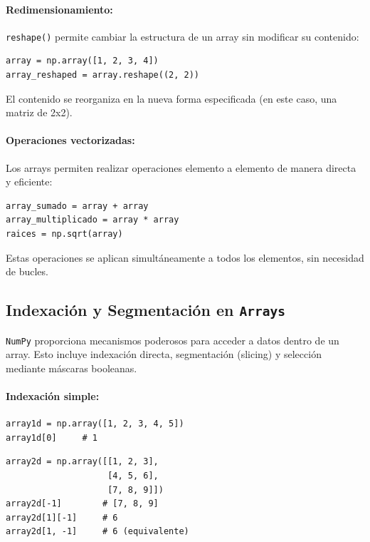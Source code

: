 \documentclass{article}
\theoremstyle{nonumberplain}
\begin{document}
\paragraph{Redimensionamiento:}

\texttt{reshape()} permite cambiar la estructura de un array sin modificar su contenido:

\begin{verbatim}
array = np.array([1, 2, 3, 4])
array_reshaped = array.reshape((2, 2))
\end{verbatim}

El contenido se reorganiza en la nueva forma especificada (en este caso, una matriz de 2x2).

\paragraph{Operaciones vectorizadas:}

Los arrays permiten realizar operaciones elemento a elemento de manera directa y eficiente:

\begin{verbatim}
array_sumado = array + array
array_multiplicado = array * array
raices = np.sqrt(array)
\end{verbatim}

Estas operaciones se aplican simultáneamente a todos los elementos, sin necesidad de bucles.

\subsection*{Indexación y Segmentación en \texttt{Arrays}}

\texttt{NumPy} proporciona mecanismos poderosos para acceder a datos dentro de un array. Esto incluye indexación directa, segmentación (slicing) y selección mediante máscaras booleanas.

\paragraph{Indexación simple:}

\begin{verbatim}
array1d = np.array([1, 2, 3, 4, 5])
array1d[0]     # 1
\end{verbatim}

\begin{verbatim}
array2d = np.array([[1, 2, 3],
                    [4, 5, 6],
                    [7, 8, 9]])
array2d[-1]        # [7, 8, 9]
array2d[1][-1]     # 6
array2d[1, -1]     # 6 (equivalente)
\end{verbatim}
\end{document}

